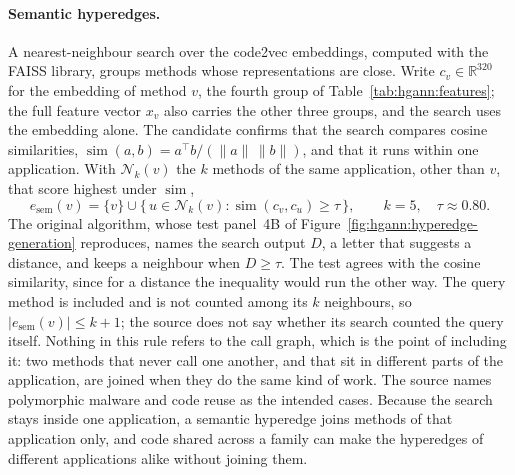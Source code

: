 \paragraph{Semantic hyperedges.} A nearest-neighbour search over the code2vec embeddings, computed
with the FAISS library, groups methods whose representations are close. Write
$c_v \in \mathbb{R}^{320}$ for the embedding of method $v$, the fourth group of
Table~\ref{tab:hgann:features}; the full feature vector $x_v$ also carries the other three groups,
and the search uses the embedding alone. The candidate confirms that the search compares cosine
similarities, $\operatorname{sim}(a, b) = a^{\top} b / (\lVert a \rVert\, \lVert b \rVert)$, and
that it runs within one application. With $\mathcal{N}_k(v)$ the $k$ methods of the same
application, other than $v$, that score highest under $\operatorname{sim}$,
\begin{equation}
  e_{\text{sem}}(v) = \{v\} \cup \{\, u \in \mathcal{N}_k(v) : \operatorname{sim}(c_v, c_u) \ge \tau \,\},
  \qquad k = 5, \quad \tau \approx 0.80 .
  \label{eq:hgann:sem}
\end{equation}
The original algorithm, whose test panel~4B of Figure~\ref{fig:hgann:hyperedge-generation}
reproduces, names the search output $D$, a letter that suggests a distance, and keeps a neighbour
when $D \ge \tau$. The test agrees with the cosine similarity, since for a distance the inequality
would run the other way. The query
method is included and is not counted among its $k$ neighbours, so
$\lvert e_{\text{sem}}(v) \rvert \le k + 1$; the source does not say whether its search counted the
query itself. Nothing in this rule refers to the call graph, which is the point of including it:
two methods that never call one another, and that sit in different parts of the application, are
joined when they do the same kind of work. The source names polymorphic malware and code reuse as
the intended cases. Because the search stays inside one application, a semantic hyperedge joins
methods of that application only, and code shared across a family can make the hyperedges of
different applications alike without joining them.

